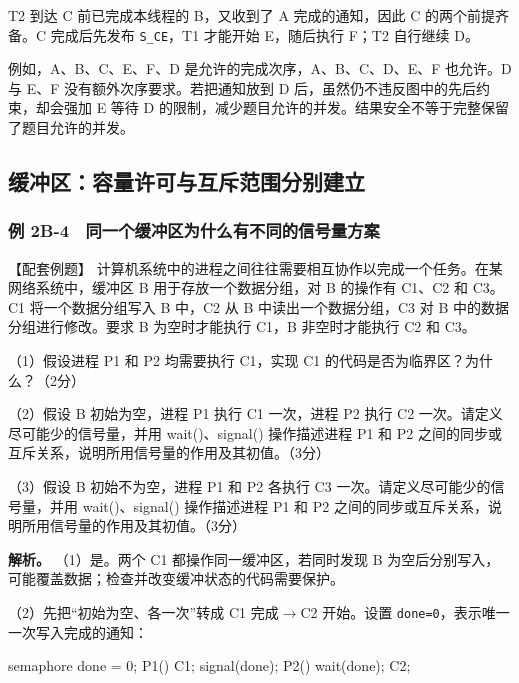 T2 到达 C 前已完成本线程的 B，又收到了 A 完成的通知，因此 C 的两个前提齐备。C 完成后先发布 \texttt{S\_CE}，T1 才能开始 E，随后执行 F；T2 自行继续 D。

例如，A、B、C、E、F、D 是允许的完成次序，A、B、C、D、E、F 也允许。D 与 E、F 没有额外次序要求。若把通知放到 D 后，虽然仍不违反图中的先后约束，却会强加 E 等待 D 的限制，减少题目允许的并发。结果安全不等于完整保留了题目允许的并发。


\subsection{缓冲区：容量许可与互斥范围分别建立}\label{OS02-buffer}

\subsubsection{例 2B-4　同一个缓冲区为什么有不同的信号量方案}\label{OS02-ex-2024}

\begin{example}[配套例题]

【配套例题】 计算机系统中的进程之间往往需要相互协作以完成一个任务。在某网络系统中，缓冲区 B 用于存放一个数据分组，对 B 的操作有 C1、C2 和 C3。C1 将一个数据分组写入 B 中，C2 从 B 中读出一个数据分组，C3 对 B 中的数据分组进行修改。要求 B 为空时才能执行 C1，B 非空时才能执行 C2 和 C3。

（1）假设进程 P1 和 P2 均需要执行 C1，实现 C1 的代码是否为临界区？为什么？（2分）

（2）假设 B 初始为空，进程 P1 执行 C1 一次，进程 P2 执行 C2 一次。请定义尽可能少的信号量，并用 wait()、signal() 操作描述进程 P1 和 P2 之间的同步或互斥关系，说明所用信号量的作用及其初值。（3分）

（3）假设 B 初始不为空，进程 P1 和 P2 各执行 C3 一次。请定义尽可能少的信号量，并用 wait()、signal() 操作描述进程 P1 和 P2 之间的同步或互斥关系，说明所用信号量的作用及其初值。（3分）

\end{example}

\textbf{解析。} （1）是。两个 C1 都操作同一缓冲区，若同时发现 B 为空后分别写入，可能覆盖数据；检查并改变缓冲状态的代码需要保护。

（2）先把``初始为空、各一次''转成 C1 完成\ensuremath{\to}C2 开始。设置 \texttt{done=\allowbreak{}0}，表示唯一一次写入完成的通知：

\par\medskip\noindent\begin{minipage}{\linewidth}
\begin{codeblock}[language={}]
semaphore done = 0;
P1() { C1; signal(done); }
P2() { wait(done); C2; }
\end{codeblock}
\end{minipage}\par\medskip

